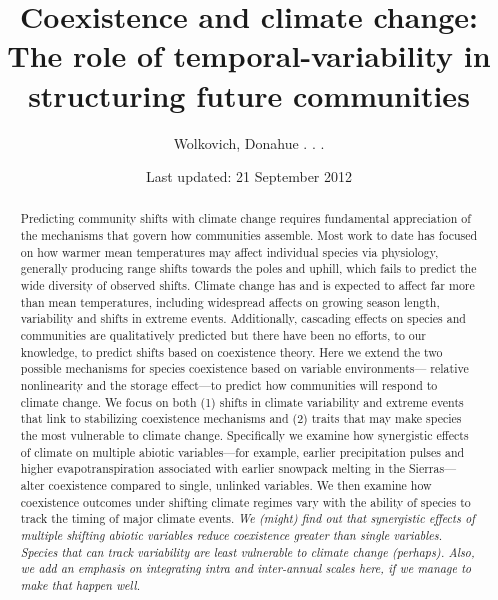 \documentclass[11pt,a4paper,oneside]{article}
\begin{document}
\renewcommand{\labelitemi}{$ $}
\title{Coexistence and climate change: \\The role of
    temporal-variability in structuring future communities}
    \author{Wolkovich, Donahue . . .}
\date{Last updated: 21 September 2012}
\maketitle

\begin{abstract} Predicting community shifts
with climate change requires fundamental appreciation of the
mechanisms that govern how communities assemble. Most work to date has
focused on how warmer mean temperatures may affect individual species
via physiology, generally producing range shifts towards the poles and
uphill, which fails to predict the wide diversity of observed shifts.
Climate change has and is expected to affect far more than mean
temperatures, including widespread affects on growing season
length, variability and shifts in extreme events. Additionally,
cascading effects on species and communities are qualitatively
predicted but there have been no efforts, to our knowledge, to predict
shifts based on coexistence theory. Here we extend the two possible
mechanisms for species coexistence based on variable environments---
relative nonlinearity and the storage effect---to predict how
communities will respond to climate change. We focus on both (1) shifts in
climate variability and extreme events that link to
stabilizing coexistence mechanisms and (2) traits that may
make species the most vulnerable to climate change. Specifically we examine how
synergistic effects of climate on multiple abiotic variables---for
example, earlier precipitation pulses and higher evapotranspiration
associated with earlier snowpack melting in the Sierras---alter
coexistence compared to single, unlinked variables. We then examine how
coexistence outcomes under shifting climate regimes vary with the
ability of species to track the timing of major climate events. \emph{We
  (might) find out that synergistic effects of multiple shifting
  abiotic variables reduce coexistence greater than single
  variables. Species that can track variability are least vulnerable
  to climate change (perhaps).  Also, we add an emphasis on integrating intra and inter-annual
scales here, if we manage to make that happen well.}
\end{abstract}

\newpage
\end{document}
